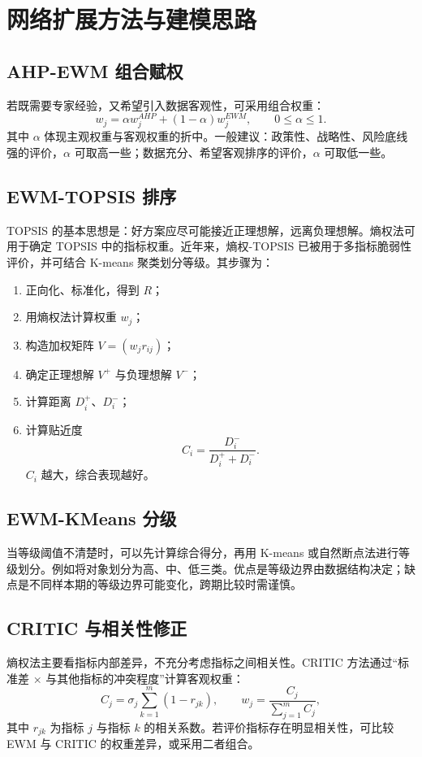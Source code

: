\documentclass[UTF8,zihao=-4]{ctexart}
\begin{document}
\section{网络扩展方法与建模思路}

\subsection{AHP-EWM 组合赋权}
若既需要专家经验，又希望引入数据客观性，可采用组合权重：
\begin{equation}
w_j=\alpha w_j^{AHP}+(1-\alpha)w_j^{EWM},\qquad 0\le \alpha\le 1.
\end{equation}
其中 $\alpha$ 体现主观权重与客观权重的折中。一般建议：政策性、战略性、风险底线强的评价，$\alpha$ 可取高一些；数据充分、希望客观排序的评价，$\alpha$ 可取低一些。

\subsection{EWM-TOPSIS 排序}
TOPSIS 的基本思想是：好方案应尽可能接近正理想解，远离负理想解。熵权法可用于确定 TOPSIS 中的指标权重。近年来，熵权-TOPSIS 已被用于多指标脆弱性评价，并可结合 K-means 聚类划分等级\cite{peng2024heritage}。其步骤为：
\begin{enumerate}
  \item 正向化、标准化，得到 $R$；
  \item 用熵权法计算权重 $w_j$；
  \item 构造加权矩阵 $V=(w_j r_{ij})$；
  \item 确定正理想解 $V^+$ 与负理想解 $V^-$；
  \item 计算距离 $D_i^+$、$D_i^-$；
  \item 计算贴近度
  \begin{equation}
  C_i=\frac{D_i^-}{D_i^+ + D_i^-}.
  \end{equation}
  $C_i$ 越大，综合表现越好。
\end{enumerate}

\subsection{EWM-KMeans 分级}
当等级阈值不清楚时，可以先计算综合得分，再用 K-means 或自然断点法进行等级划分。例如将对象划分为高、中、低三类。优点是等级边界由数据结构决定；缺点是不同样本期的等级边界可能变化，跨期比较时需谨慎。

\subsection{CRITIC 与相关性修正}
熵权法主要看指标内部差异，不充分考虑指标之间相关性。CRITIC 方法通过“标准差 $\times$ 与其他指标的冲突程度”计算客观权重：
\begin{equation}
C_j=\sigma_j\sum_{k=1}^{m}(1-r_{jk}),\qquad w_j=\frac{C_j}{\sum_{j=1}^{m}C_j},
\end{equation}
其中 $r_{jk}$ 为指标 $j$ 与指标 $k$ 的相关系数。若评价指标存在明显相关性，可比较 EWM 与 CRITIC 的权重差异，或采用二者组合。
\end{document}
